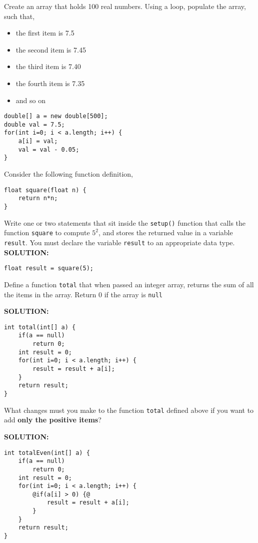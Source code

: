 \documentclass[11pt]{exam}
\begin{document}
\begin{questions}
\question Create an array that holds 100 real numbers. Using a loop, populate the array, such that,

\begin{itemize}
	\item the first item is 7.5
	\item the second item is 7.45
	\item the third item is 7.40
	\item the fourth item is 7.35
	\item and so on
\end{itemize} 

\ifprintanswers
\begin{lstlisting}
double[] a = new double[500];
double val = 7.5;
for(int i=0; i < a.length; i++) {
	a[i] = val;
	val = val - 0.05;
}
\end{lstlisting}
\newpage
\else \newpage
\fi

\question
Consider the following function definition,

\begin{lstlisting}
float square(float n) {
	return n*n;
}
\end{lstlisting}

Write one or two statements that sit inside the \texttt{setup()} function that calls the function \texttt{square} to compute $5^2$, and stores the returned value in a variable \texttt{result}. You must declare the variable \texttt{result} to an appropriate data type.
\ifprintanswers \vskip 1cm \textbf{SOLUTION:} \vskip 1cm
\begin{lstlisting}
float result = square(5);
\end{lstlisting}
\newpage \else
\vskip 3cm
\fi

\question Define a function \texttt{total} that when passed an integer array, returns the sum of all the items in the array. Return 0 if the array is \texttt{null}

\ifprintanswers \vskip 1cm \textbf{SOLUTION:} \vskip 1cm
\begin{lstlisting}[numbers=none, frame=single ,style=buggy]
int total(int[] a) {
	if(a == null)
		return 0;
	int result = 0;
	for(int i=0; i < a.length; i++) {
		result = result + a[i];
	}
	return result;
}	
\end{lstlisting}
\newpage \else
\newpage
\fi

\question What changes must you make to the function \texttt{total} defined above if you want to add \textbf{only the positive items}?

\ifprintanswers \vskip 1cm \textbf{SOLUTION:} \vskip 1cm
\begin{lstlisting}[numbers=none, frame=single ,style=buggy]
int totalEven(int[] a) {
	if(a == null)
		return 0;
	int result = 0;
	for(int i=0; i < a.length; i++) {
		@if(a[i] > 0) {@
			result = result + a[i];
		}
	}
	return result;
}	
\end{lstlisting}
\newpage \else
\vskip 6cm
\fi


\end{questions}
\end{document}
